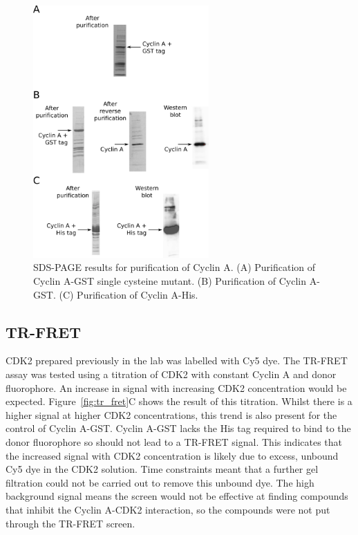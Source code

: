 \begin{figure}
\centering

\includegraphics[width=0.6\textwidth]{figures/purification/purification}

\caption{SDS-PAGE results for purification of Cyclin A.
(A) Purification of Cyclin A-GST single cysteine mutant.
(B) Purification of Cyclin A-GST.
(C) Purification of Cyclin A-His.}

\label{fig:purification}
\end{figure}


\subsection{TR-FRET}

CDK2 prepared previously in the lab was labelled with Cy5 dye.
The TR-FRET assay was tested using a titration of CDK2 with constant Cyclin A and donor fluorophore.
An increase in signal with increasing CDK2 concentration would be expected.
Figure~\ref{fig:tr_fret}C shows the result of this titration.
Whilst there is a higher signal at higher CDK2 concentrations, this trend is also present for the control of Cyclin A-GST.
Cyclin A-GST lacks the His tag required to bind to the donor fluorophore so should not lead to a TR-FRET signal.
This indicates that the increased signal with CDK2 concentration is likely due to excess, unbound Cy5 dye in the CDK2 solution.
Time constraints meant that a further gel filtration could not be carried out to remove this unbound dye.
The high background signal means the screen would not be effective at finding compounds that inhibit the Cyclin A-CDK2 interaction, so the compounds were not put through the TR-FRET screen.

